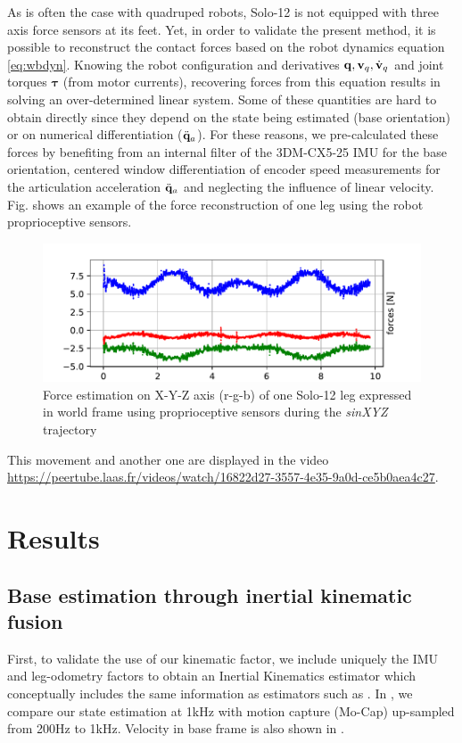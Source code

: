 As is often the case with quadruped robots, Solo-12 is not equipped with three axis force sensors at its feet. 
Yet, in order to validate the present method, it is possible to reconstruct the contact forces based on the robot dynamics 
equation \eqref{eq:wbdyn}. Knowing the robot configuration and derivatives ${\bf q},{\bf v}_q,\dot{{\bf v}}_q$ and joint torques $\bm\tau$ (from motor currents), 
recovering forces from this equation results in solving an over-determined linear system. Some of these quantities are hard to obtain directly 
since they depend on the state being estimated (\eg base orientation) or on numerical differentiation ($\ddot{{\bf q}}_a$). For these reasons, we pre-calculated 
these forces by benefiting from an internal filter of the 3DM-CX5-25 IMU for the base orientation, centered window differentiation of encoder speed 
measurements for the articulation acceleration $\ddot{{\bf q}}_a$ and neglecting the influence of linear velocity. Fig.  shows an example of 
the force reconstruction of one leg using the robot proprioceptive sensors.
%
\begin{figure}
    \centering
    \includegraphics[width=0.9\columnwidth]{figures/centroidal/forces_solo_1leg.pdf}
    \caption{Force estimation on X-Y-Z axis (r-g-b) of one Solo-12 leg expressed in world frame using proprioceptive sensors during the \textit{sinXYZ} trajectory}
    \label{fig:force_est}
\end{figure}

This movement and another one are displayed in the video \url{https://peertube.laas.fr/videos/watch/16822d27-3557-4e35-9a0d-ce5b0aea4c27}.



\section{Results}

\subsection{Base estimation through inertial kinematic fusion}
First, to validate the use of our kinematic factor, we include uniquely the IMU and leg-odometry factors to obtain an Inertial Kinematics estimator which 
conceptually includes the same information as estimators such as \cite{bloesch2013state}. In , we compare our state estimation 
at 1kHz with motion capture (Mo-Cap) up-sampled from 200Hz to 1kHz.
Velocity in base frame is also shown in .

